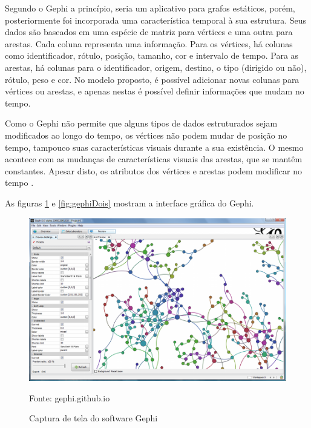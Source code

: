 Segundo \cite{dynagraph} o Gephi a princípio, seria um aplicativo para grafos estáticos, porém, posteriormente
foi incorporada uma característica temporal à sua estrutura. Seus dados são baseados em
uma espécie de matriz para vértices e uma outra para arestas. Cada coluna representa uma
informação. Para os vértices, há colunas como identificador, rótulo, posição, tamanho, cor
e intervalo de tempo. Para as arestas, há colunas para o identificador, origem, destino, o
tipo (dirigido ou não), rótulo, peso e cor. No modelo proposto, é possível adicionar novas
colunas para vértices ou arestas, e apenas nestas é possível definir informações que mudam
no tempo.

Como o Gephi não permite que alguns tipos de dados estruturados sejam modificados ao longo do tempo,
os vértices não podem mudar de posição no tempo, tampouco suas características visuais durante a sua existência.
O mesmo acontece com as mudanças de características visuais das arestas, que se mantêm constantes. Apesar
disto, os atributos dos vértices e arestas podem modificar no tempo \cite{dynagraph}.

As figuras \ref{fig:gephiUm} e \ref{fig:gephiDois} mostram a interface gráfica do Gephi.

\begin{figure}[htbp]
\centering
 \includegraphics[width=.90\textwidth]{chapters/fig/gephiUm.png}
\caption{Captura de tela do software Gephi}
Fonte: gephi.github.io
\label{fig:gephiUm}
\end{figure}

